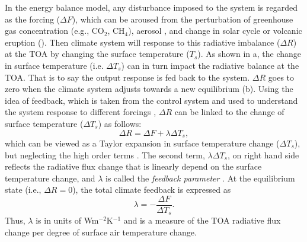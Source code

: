  In the energy balance model, any disturbance imposed to the system is regarded as the forcing ($\Delta F$), which can be aroused from the perturbation of greenhouse gas concentration (e.g., CO$_2$, CH$_4$), aerosol \citep{Ramanathan2001aerosols}, and change in solar cycle \citep{Frohlich2004solar} or volcanic eruption (). Then climate system will response to this radiative imbalance ($\Delta R$) at the TOA  by changing the surface temperature ($T_s$). As shown in a, the change in surface temperature (i.e. $\Delta T_s$) can in turn impact the radiative balance at the TOA. That is to say the output response is fed back to the system. $\Delta R$ goes to zero when the climate system adjusts towards a new equilibrium (b). Using the idea of feedback, which is taken from the control system and used to understand the system response to different forcings \citep{Stephens2005cloud},
$\Delta R$ can be linked to the change of surface temperature ($\Delta T_s$) as follows:
\begin{equation}
    \Delta R = \Delta F + \lambda \Delta T_s,
    \label{eq:imbalance_forcing_lambda}
\end{equation}
which can be viewed as a Taylor expansion in surface temperature change ($\Delta T_s$), but neglecting the high order terms \citep{Feldl2013a}. The second term, $\lambda \Delta T_s$, on right hand side reflects the radiative flux change that is linearly depend on the surface temperature change, and $\lambda$ is called the \textit{feedback parameter} \citep{Gregory2004}. At the equilibrium state (i.e., $\Delta R=0$), the total climate feedback is expressed as 
\begin{equation}
    \lambda = -\frac{\Delta F}{\Delta T_s}.
\end{equation}
Thus, $\lambda$ is in units of Wm$^{-2}$K$^{-1}$ and is a measure of the TOA radiative flux change per degree of surface air temperature change. 

